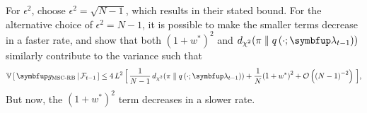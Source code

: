 \begin{proofEnd}
  For \(\epsilon^2\), \citeauthor{cardoso_brsnis_2022} choose \(\epsilon^2 = \sqrt{N-1}\), which results in their stated bound. 
  For the alternative choice of \(\epsilon^2 = N-1\), it is possible to make the smaller terms decrease in a faster rate, and show that both \({\left(1 + w^*\right)}^2\) and \(\DChi{\pi}{q\left(\cdot; \vlambda_{t-1}\right)}\) similarly contribute to the variance such that
  \begin{align*}
    \V{ \vg_{\text{MSC-RB}} \,\middle|\, \mathcal{F}_{t-1} } \leq
    4\,L^2 \, \Big[\,
      \frac{1}{N-1}\,\DChi{\pi}{q\left(\cdot; \vlambda_{t-1}\right)}
      +
      \frac{1}{N} {\left(1 + w^*\right)}^2
      +
      \mathcal{O}\left({\left(N-1\right)}^{-2}\right)
    \,\Big],
  \end{align*}
  But now, the \({\left(1+w^*\right)}^2\) term decreases in a slower rate.
\end{proofEnd}

